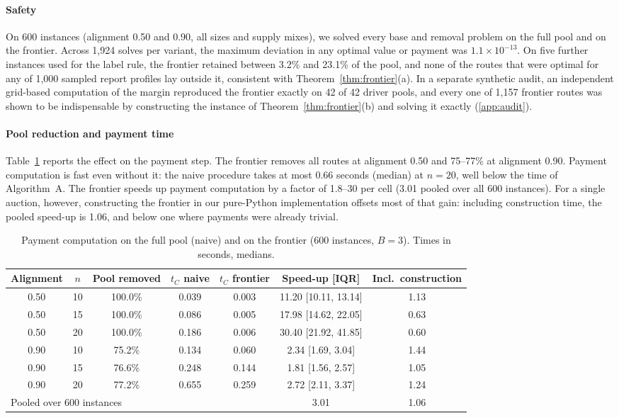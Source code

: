 \documentclass[review,12pt]{elsarticle}
\theoremstyle{definition}
\theoremstyle{remark}
\begin{document}
\paragraph{Safety} On 600 instances (alignment 0.50 and 0.90, all sizes and
supply mixes), we solved every base and removal problem on the full pool and
on the frontier. Across 1,924 solves per variant, the maximum deviation in
any optimal value or payment was $1.1\times10^{-13}$. On five further
instances used for the label rule, the frontier retained between 3.2\% and
23.1\% of the pool, and none of the routes that were optimal for any of
1,000 sampled report profiles lay outside it, consistent with
Theorem~\ref{thm:frontier}(a). In a separate synthetic audit, an
independent grid-based computation of the margin reproduced the frontier
exactly on 42 of 42 driver pools, and every one of 1,157 frontier routes was
shown to be indispensable by constructing the instance of
Theorem~\ref{thm:frontier}(b) and solving it exactly
(\ref{app:audit}).

\paragraph{Pool reduction and payment time} Table~\ref{tab:rq4} reports the
effect on the payment step. The frontier removes all routes at alignment
0.50 and 75--77\% at alignment 0.90. Payment computation is fast even
without it: the naive procedure takes at most 0.66 seconds (median) at
$n=20$, well below the time of Algorithm~A. The frontier speeds up payment
computation by a factor of 1.8--30 per cell (3.01 pooled over all 600
instances). For a single auction, however, constructing the frontier in our
pure-Python implementation offsets most of that gain: including construction
time, the pooled speed-up is 1.06, and below one where payments were already
trivial.

\begin{table}[t]
\centering
\caption{Payment computation on the full pool (naive) and on the frontier (600 instances, $B=3$). Times in seconds, medians.}
\label{tab:rq4}
\small
\begin{tabular}{ccccccc}
\toprule
Alignment & $n$ & Pool removed & $t_C$ naive & $t_C$ frontier & Speed-up [IQR] & Incl.\ construction\\
\midrule
0.50 & 10 & 100.0\% & 0.039 & 0.003 & 11.20 [10.11, 13.14] & 1.13\\
0.50 & 15 & 100.0\% & 0.086 & 0.005 & 17.98 [14.62, 22.05] & 0.63\\
0.50 & 20 & 100.0\% & 0.186 & 0.006 & 30.40 [21.92, 41.85] & 0.60\\
0.90 & 10 & 75.2\% & 0.134 & 0.060 & 2.34 [1.69, 3.04] & 1.44\\
0.90 & 15 & 76.6\% & 0.248 & 0.144 & 1.81 [1.56, 2.57] & 1.05\\
0.90 & 20 & 77.2\% & 0.655 & 0.259 & 2.72 [2.11, 3.37] & 1.24\\
\midrule
\multicolumn{5}{l}{Pooled over 600 instances} & 3.01 & 1.06\\
\bottomrule
\end{tabular}
\end{table}
\end{document}
